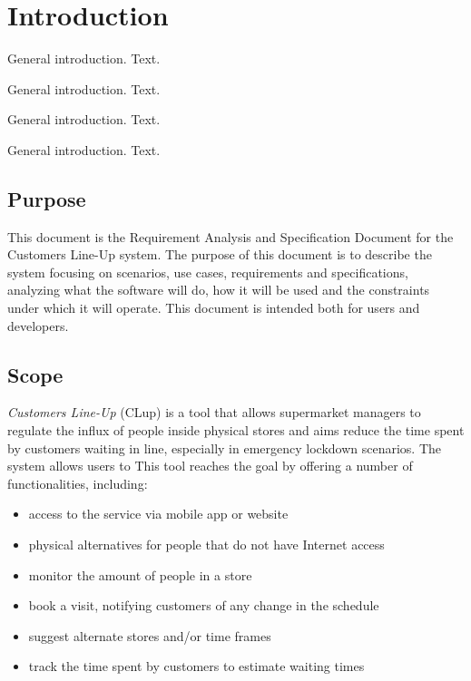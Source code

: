 \section{Introduction}\label{sec:intro}

General introduction. Text.

General introduction. Text.

General introduction. Text.

General introduction. Text.

\subsection{Purpose}
This document is the Requirement Analysis and Specification Document for the Customers Line-Up system.
The purpose of this document is to describe the system focusing on scenarios, use cases, requirements and specifications,
analyzing what the software will do, how it will be used and the constraints under which it will operate.
This document is intended both for users and developers.

\subsection{Scope}

\emph{Customers Line-Up} (CLup) is a tool that allows supermarket managers to regulate the influx of people inside
physical stores and aims reduce the time spent by customers waiting in line, especially in emergency lockdown scenarios.
The system allows users to 
This tool reaches the goal by offering a number of functionalities, including:
\begin{itemize}
    \item access to the service via mobile app or website
    \item physical alternatives for people that do not have Internet access
    \item monitor the amount of people in a store
    \item book a visit, notifying customers of any change in the schedule
    \item suggest alternate stores and/or time frames
    \item track the time spent by customers to estimate waiting times
\end{itemize}

